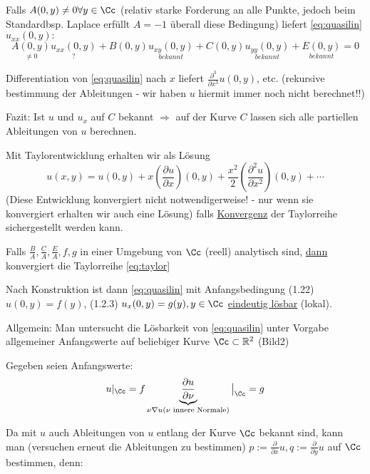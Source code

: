 Falls $A(0,y) \neq 0 \forall y\in \Cc$ (relativ starke Forderung an alle Punkte, jedoch beim Standardbsp. Laplace erfüllt  $A=-1$ überall diese Bedingung) liefert \eqref{eq:quasilin} $u_{xx}(0,y):$
\[
    \underset{\neq 0}{A(0,y)} \underset{?}{u_{xx}(0,y)} + B(0,y) \underset{bekannt}{u_{xy}(0,y)} + C(0,y) \underset{bekannt}{u_{yy}(0,y)} + \underset{bekannt}{E(0,y)} = 0
\]

Differentiation von \eqref{eq:quasilin} nach $x$ liefert $\frac{\partial^3}{\partial x^3}u(0,y)$, etc. (rekursive bestimmung der Ableitungen - wir haben $u$ hiermit immer noch nicht berechnet!!)

Fazit: Ist $u$ und $u_x$ auf $C$ bekannt $\Rightarrow$ auf der Kurve $C$ lassen sich alle partiellen Ableitungen von $u$ berechnen.

Mit Taylorentwicklung erhalten wir als Lösung 
\begin{equation} %
    u(x,y) = u(0,y) + x \left( \frac{\partial u}{\partial x} \right)(0,y) + \frac{x^2}{2} \left( \frac{\partial^2 u}{\partial x^2} \right) (0,y) + \cdots
    \label{eq:taylor}
\end{equation}
(Diese Entwicklung konvergiert nicht notwendigerweise! - nur wenn sie konvergiert erhalten wir auch eine Lösung)
falls \underline{Konvergenz} der Taylorreihe sichergestellt werden kann.

\begin{satz}
    Falls $\frac{B}{A}, \frac{C}{A}, \frac{E}{A}, f, g$ in einer Umgebung von $\Cc$ (reell) analytisch sind,  \underline{dann} konvergiert die Taylorreihe \eqref{eq:taylor}
\end{satz}

Nach Konstruktion ist dann \eqref{eq:quasilin} mit Anfangsbedingung (1.22) $u(0,y) = f(y)$, (1.2.3) $u_x(0,y) = g(y), y\in\Cc$ \underline{eindeutig lösbar} (lokal).

Allgemein: Man untersucht die Lösbarkeit von \eqref{eq:quasilin} unter Vorgabe allgemeiner Anfangswerte auf beliebiger Kurve $\Cc\subset \R^2$ (Bild2) 

Gegeben seien Anfangswerte: 
\begin{equation}[Cauchy-Daten] %
    u|_\Cc = f \\
    \underbrace{\frac{\partial u}{ \partial \nu}}_{\nu \nabla u (\nu \text{ innere Normale})} \big|_\Cc = g
\end{equation}

Da mit $u$ auch Ableitungen von $u$ entlang der Kurve $\Cc$ bekannt sind, kann man (versuchen erneut die Ableitungen zu bestimmen)  $p:= \frac{\partial}{ \partial x} u, q:=\frac{\partial}{\partial y} u$ auf $\Cc$ bestimmen, denn:\\

